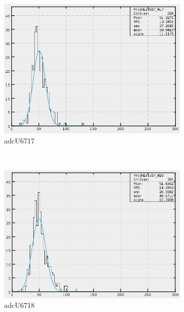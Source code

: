 \begin{figure}[h]
\begin{subfigure}[h]{0.3\textwidth}
        \includegraphics[width=\textwidth, keepaspectratio = true]{adcU67_17}
        \caption{adcU6717}
        \label{fig:adcU67_17}
    \end{subfigure}
    ~
    \begin{subfigure}[h]{0.3\textwidth}
        \centering
        \includegraphics[width=\textwidth, keepaspectratio = true]{adcU67_18}
        \caption{adcU6718}
        \label{fig:adcU67_18}
    \end{subfigure}
    ~
    \begin{subfigure}[h]{0.3\textwidth}
        \centering

\end{subfigure}
\end{figure}
